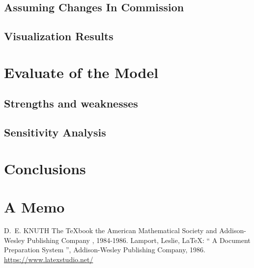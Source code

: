 \documentclass{mcmthesis}
\begin{document}
\subsection{Assuming Changes In Commission}

\subsection{Visualization Results}%





\section{Evaluate of the Model}
\subsection{Strengths and weaknesses}

\subsection{Sensitivity Analysis}




\section{Conclusions}


\section{A Memo}








\begin{thebibliography}{99}
 D.~E. KNUTH   The \TeX{}book  the American
Mathematical Society and Addison-Wesley
Publishing Company , 1984-1986.
Lamport, Leslie,  \LaTeX{}: `` A Document Preparation System '',
Addison-Wesley Publishing Company, 1986.
\url{https://www.latexstudio.net/}
\end{thebibliography}
\end{document}
